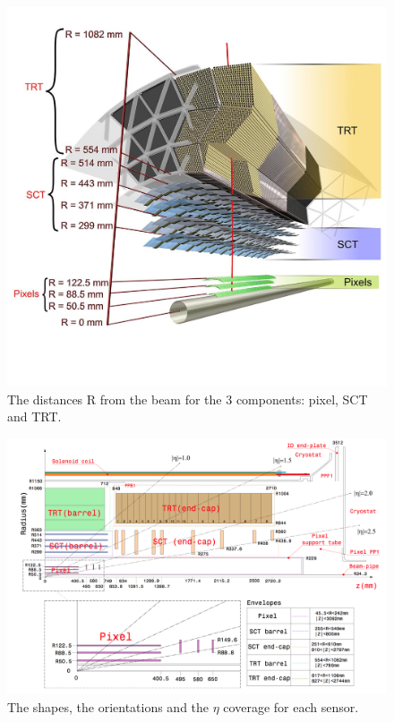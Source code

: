 \begin{figure}
\centering
\includegraphics[width=\textwidth]{data/photo/detector/inner_detail.jpg}
\caption{The distances R from the beam for the 3 components: pixel, SCT and TRT. \cite{inner_photo}}
\label{fig:detector_inner_detail}
\end{figure}
\begin{figure}
\centering
\includegraphics[width=\textwidth]{data/photo/detector/inner_size.png}
\caption{The shapes, the orientations and the $\eta$ coverage for each sensor. \cite{ATLAS_doc}}
\label{fig:detector_inner_size}
\end{figure}

